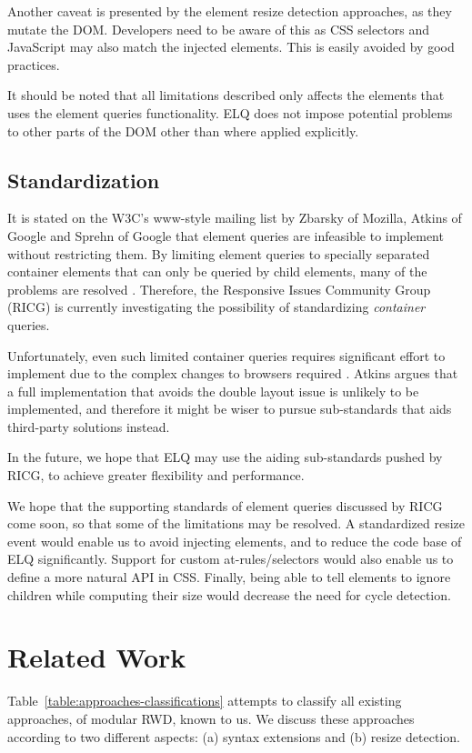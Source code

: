 \documentclass{acm_proc_article-sp}
\newcommand{\elq}{ELQ}
\begin{document}
    Another caveat is presented by the element resize detection approaches, as they mutate the DOM.
    Developers need to be aware of this as CSS selectors and JavaScript may also match the injected elements.
    This is easily avoided by good practices.

    It should be noted that all limitations described only affects the elements that uses the element queries functionality.
    \elq{} does not impose potential problems to other parts of the DOM other than where applied explicitly.

  \subsection{Standardization}
    It is stated on the W3C's www-style mailing list \cite{w3c_eq_mail} by Zbarsky of Mozilla, Atkins of Google and Sprehn of Google that element queries are infeasible to implement without restricting them.
    By limiting element queries to specially separated container elements that can only be queried by child elements, many of the problems are resolved \cite{ricg_irc_log,ricg_issue_viewport}.
    Therefore, the Responsive Issues Community Group (RICG) is currently investigating the possibility of standardizing \emph{container} queries.

    Unfortunately, even such limited container queries requires significant effort to implement due to the complex changes to browsers required \cite{ricg_issue_viewport}.
    Atkins argues that a full implementation that avoids the double layout issue is unlikely to be implemented, and therefore it might be wiser to pursue sub-standards that aids third-party solutions instead.
   
    In the future, we hope that \elq{} may use the aiding sub-standards pushed by RICG, to achieve greater flexibility and performance.

    We hope that the supporting standards of element queries discussed by RICG come soon, so that some of the limitations may be resolved.
    A standardized resize event would enable us to avoid injecting elements, and to reduce the code base of \elq{} significantly.
    Support for custom at-rules/selectors would also enable us to define a more natural API in CSS.
    Finally, being able to tell elements to ignore children while computing their size would decrease the need for cycle detection.


\section{Related Work}\label{sec:related}
  Table~\ref{table:approaches-classifications} attempts to classify all existing approaches, of modular RWD, known to us. 
  We discuss these approaches according to two different aspects: (a) syntax extensions and (b) resize detection.
\end{document}
